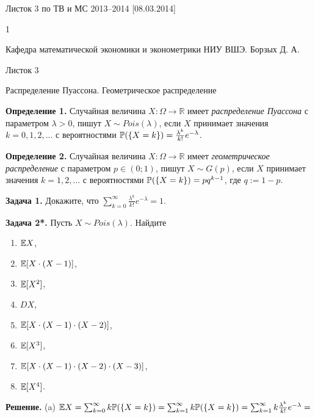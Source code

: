 

Листок 3 по ТВ и МС 2013--2014 [08.03.2014]





1

Кафедра математической экономики и эконометрики НИУ ВШЭ. Борзых Д. А.

Листок 3 

Распределение Пуассона. Геометрическое распределение



\textbf{Определение 1.} Случайная величина $X:\Omega \to {\mathbb R}$ имеет \textit{распределение Пуассона} с параметром $\lambda >0$, пишут $X\sim Pois(\lambda )$, если $X$ принимает значения $k=0,1,2,...$ с вероятностями ${\rm {\mathbb P}}(\{ X=k\} )={\tfrac{\lambda ^{k} }{k!}} e^{-\lambda } $.

\textbf{Определение 2.} Случайная величина $X:\Omega \to {\mathbb R}$ имеет \textit{геометрическое распределение} с параметром $p\in (0;1)$, пишут $X\sim G(p)$, если $X$ принимает значения $k=1,2,...$ с вероятностями ${\rm {\mathbb P}}(\{ X=k\} )=pq^{k-1} $, где $q:=1-p$.



\textbf{Задача 1.} Докажите, что $\sum _{k=0}^{\infty }{\tfrac{\lambda ^{k} }{k!}} e^{-\lambda }  =1$.

\textbf{Задача 2*.} Пусть $X\sim Pois(\lambda )$. Найдите

\begin{enumerate}
\item  ${\rm {\mathbb E}}X$,

\item  ${\rm {\mathbb E}}[X\cdot (X-1)]$,

\item  ${\rm {\mathbb E}}[X^{2} ]$,

\item  $DX$,

\item  ${\rm {\mathbb E}}[X\cdot (X-1)\cdot (X-2)]$,

\item  ${\rm {\mathbb E}}[X^{3} ]$,

\item  ${\rm {\mathbb E}}[X\cdot (X-1)\cdot (X-2)\cdot (X-3)]$,

\item  ${\rm {\mathbb E}}[X^{4} ]$.
\end{enumerate}

\textbf{Решение.} (a) ${\rm {\mathbb E}}X=\sum _{k=0}^{\infty }k{\rm {\mathbb P}}(\{ X=k\} ) =\sum _{k=1}^{\infty }k{\rm {\mathbb P}}(\{ X=k\} ) =\sum _{k=1}^{\infty }k{\tfrac{\lambda ^{k} }{k!}} e^{-\lambda }  =$

